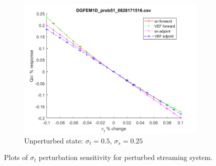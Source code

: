 \documentclass{article}
\newcommand{\sigt}{\sigma_t}
\newcommand{\sigs}{\sigma_s}
\begin{document}
\begin{figure}[H]
\begin{subfigure}{.65\textwidth}
  \centering
  \includegraphics[width=.98\linewidth]{figures/51sigtSens.png}
  \caption{Unperturbed state: $\sigt=0.5$, $\sigs=0.25$}
  \label{fig:sfig3}
\end{subfigure}
\caption{Plots of $\sigt$ perturbation sensitivity for perturbed streaming system.}
\label{fig:fig}
\end{figure}
\end{document}
